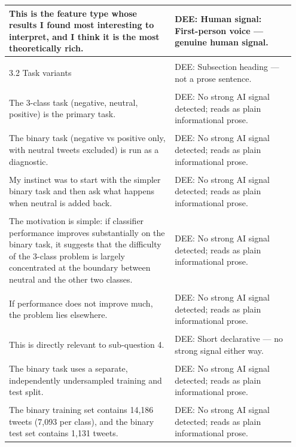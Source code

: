 \documentclass[11pt]{article}
\begin{document}
\begin{longtable}{|p{0.55\linewidth}|p{0.40\linewidth}|}
\hline
This is the feature type whose results I found most interesting to interpret, and I think it is the most theoretically rich. & DEE: Human signal: First-person voice --- genuine human signal. \\[2pt]
\hline
\rule{0pt}{3.5cm} & \\
\hline
3.2 Task variants & DEE: Subsection heading --- not a prose sentence. \\[2pt]
\hline
\rule{0pt}{3.5cm} & \\
\hline
The 3-class task (negative, neutral, positive) is the primary task. & DEE: No strong AI signal detected; reads as plain informational prose. \\[2pt]
\hline
\rule{0pt}{3.5cm} & \\
\hline
The binary task (negative vs positive only, with neutral tweets excluded) is run as a diagnostic. & DEE: No strong AI signal detected; reads as plain informational prose. \\[2pt]
\hline
\rule{0pt}{3.5cm} & \\
\hline
My instinct was to start with the simpler binary task and then ask what happens when neutral is added back. & DEE: No strong AI signal detected; reads as plain informational prose. \\[2pt]
\hline
\rule{0pt}{3.5cm} & \\
\hline
The motivation is simple: if classifier performance improves substantially on the binary task, it suggests that the difficulty of the 3-class problem is largely concentrated at the boundary between neutral and the other two classes. & DEE: No strong AI signal detected; reads as plain informational prose. \\[2pt]
\hline
\rule{0pt}{3.5cm} & \\
\hline
If performance does not improve much, the problem lies elsewhere. & DEE: No strong AI signal detected; reads as plain informational prose. \\[2pt]
\hline
\rule{0pt}{3.5cm} & \\
\hline
This is directly relevant to sub-question 4. & DEE: Short declarative --- no strong signal either way. \\[2pt]
\hline
\rule{0pt}{3.5cm} & \\
\hline
The binary task uses a separate, independently undersampled training and test split. & DEE: No strong AI signal detected; reads as plain informational prose. \\[2pt]
\hline
\rule{0pt}{3.5cm} & \\
\hline
The binary training set contains 14,186 tweets (7,093 per class), and the binary test set contains 1,131 tweets. & DEE: No strong AI signal detected; reads as plain informational prose. \\[2pt]

\end{longtable}
\end{document}
